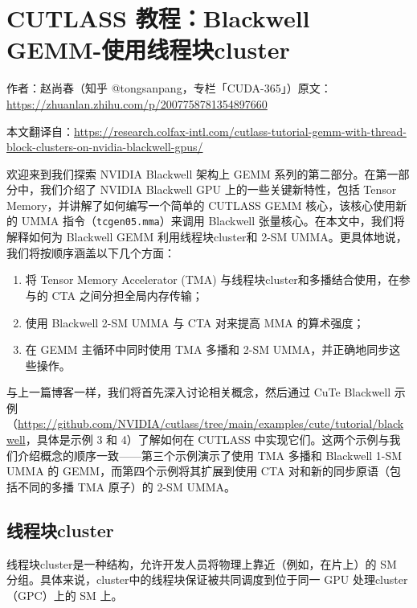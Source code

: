\chapter{CUTLASS 教程：Blackwell GEMM-使用线程块cluster}

\begin{center}\small 作者：赵尚春（知乎 @tongsanpang，专栏「CUDA-365」）\quad 原文：\url{https://zhuanlan.zhihu.com/p/2007758781354897660}\end{center}

\begingroup\setlength{\emergencystretch}{2em}

本文翻译自：\url{https://research.colfax-intl.com/cutlass-tutorial-gemm-with-thread-block-clusters-on-nvidia-blackwell-gpus/}

欢迎来到我们探索 NVIDIA Blackwell 架构上 GEMM 系列的第二部分。在第一部分中，我们介绍了 NVIDIA Blackwell GPU 上的一些关键新特性，包括 Tensor Memory，并讲解了如何编写一个简单的 CUTLASS GEMM 核心，该核心使用新的 UMMA 指令（\texttt{tcgen05.\allowbreak{}mma}）来调用 Blackwell 张量核心。在本文中，我们将解释如何为 Blackwell GEMM 利用线程块cluster和 2-SM UMMA。更具体地说，我们将按顺序涵盖以下几个方面：

\begin{enumerate}
\item 将 Tensor Memory Accelerator (TMA) 与线程块cluster和多播结合使用，在参与的 CTA 之间分担全局内存传输；
\item 使用 Blackwell 2-SM UMMA 与 CTA 对来提高 MMA 的算术强度；
\item 在 GEMM 主循环中同时使用 TMA 多播和 2-SM UMMA，并正确地同步这些操作。
\end{enumerate}

与上一篇博客一样，我们将首先深入讨论相关概念，然后通过 Cu\allowbreak{}Te Blackwell 示例（\url{https://github.com/NVIDIA/cutlass/tree/main/examples/cute/tutorial/blackwell}，具体是示例 3 和 4）了解如何在 CUTLASS 中实现它们。这两个示例与我们介绍概念的顺序一致——第三个示例演示了使用 TMA 多播和 Blackwell 1-SM UMMA 的 GEMM，而第四个示例将其扩展到使用 CTA 对和新的同步原语（包括不同的多播 TMA 原子）的 2-SM UMMA。

\section{线程块cluster}

线程块cluster是一种结构，允许开发人员将物理上靠近（例如，在片上）的 SM 分组。具体来说，cluster中的线程块保证被共同调度到位于同一 GPU 处理cluster（GPC）上的 SM 上。

